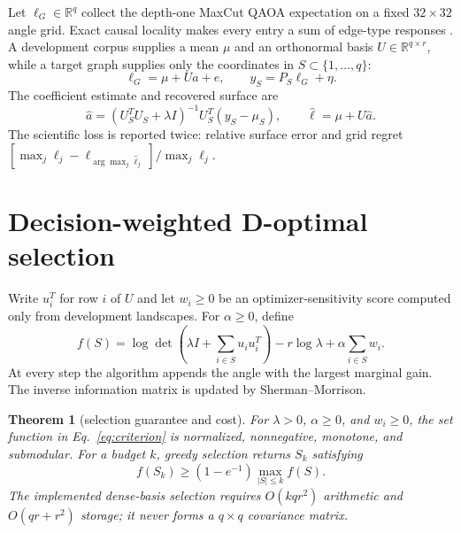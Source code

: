 \documentclass[10pt,letterpaper,twoside]{article}
\newtheorem{theorem}{Theorem}
\begin{document}
Let $\ell_G\in\mathbb R^q$ collect the depth-one MaxCut QAOA expectation on a
fixed $32\times32$ angle grid.  Exact causal locality makes every entry a sum
of edge-type responses \cite{Wang2018}.  A development corpus supplies a mean
$\mu$ and an orthonormal basis $U\in\mathbb R^{q\times r}$, while a target
graph supplies only the coordinates in $S\subset\{1,\ldots,q\}$:
\begin{equation}
 \ell_G=\mu+Ua+e,
 \qquad y_S=P_S\ell_G+\eta.                          \label{eq:model}
\end{equation}
The coefficient estimate and recovered surface are
\begin{equation}
 \widehat a=(U_S^TU_S+\lambda I)^{-1}U_S^T(y_S-\mu_S),
 \qquad \widehat\ell=\mu+U\widehat a.               \label{eq:recover}
\end{equation}
The scientific loss is reported twice: relative surface error and grid regret
$[\max_j\ell_j-\ell_{\arg\max_j\widehat\ell_j}]/\max_j\ell_j$.

\section{Decision-weighted D-optimal selection}

Write $u_i^T$ for row $i$ of $U$ and let $w_i\ge0$ be an optimizer-sensitivity
score computed only from development landscapes.  For $\alpha\ge0$, define
\begin{equation}
 f(S)=\log\det\!\left(\lambda I+\sum_{i\in S}u_i u_i^T\right)
       -r\log\lambda+\alpha\sum_{i\in S}w_i.         \label{eq:criterion}
\end{equation}
At every step the algorithm appends the angle with the largest marginal gain.
The inverse information matrix is updated by Sherman--Morrison.

\begin{theorem}[selection guarantee and cost]
\label{thm:design}
For $\lambda>0$, $\alpha\ge0$, and $w_i\ge0$, the set function in
Eq.~\eqref{eq:criterion} is normalized, nonnegative, monotone, and submodular.
For a budget $k$, greedy selection returns $S_k$ satisfying
\begin{equation}
 f(S_k)\ge(1-e^{-1})\max_{|S|\le k} f(S).             \label{eq:greedy}
\end{equation}
The implemented dense-basis selection requires $O(kqr^2)$ arithmetic and
$O(qr+r^2)$ storage; it never forms a $q\times q$ covariance matrix.
\end{theorem}
\end{document}
